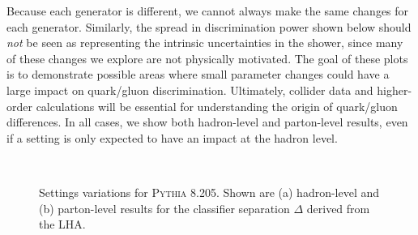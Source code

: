 \documentclass[11pt]{cernrep}
\begin{document}
Because each generator is different, we cannot always make the same changes for each generator.  Similarly, the spread in discrimination power shown below should \emph{not} be seen as representing the intrinsic uncertainties in the shower, since many of these changes we explore are not physically motivated.  The goal of these plots is to demonstrate possible areas where small parameter changes could have a large impact on quark/gluon discrimination.  Ultimately, collider data and higher-order calculations will be essential for understanding the origin of quark/gluon differences.  In all cases, we show both hadron-level and parton-level results, even if a setting is only expected to have an impact at the hadron level.  



\begin{figure}
\centering
{}
$\qquad$
\caption{Settings variations for \textsc{Pythia 8.205}.  Shown are (a) hadron-level and (b) parton-level results for the classifier separation $\Delta$ derived from the LHA.}
\label{quarkgluon_fig:settings_variation_pythia}
\end{figure}
\end{document}
